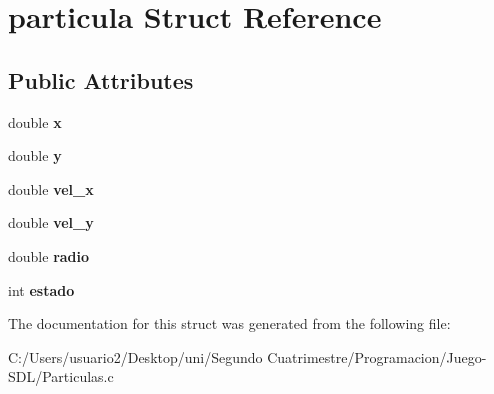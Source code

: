 \hypertarget{structparticula}{}\section{particula Struct Reference}
\label{structparticula}
\subsection*{Public Attributes}
\begin{DoxyCompactItemize}
\item 
double {\bfseries x}\hypertarget{structparticula_a906786cb7a5dc2a7f23ea413e509787e}{}\label{structparticula_a906786cb7a5dc2a7f23ea413e509787e}

\item 
double {\bfseries y}\hypertarget{structparticula_ab766b5e07eb1fe2cf2742875686cc305}{}\label{structparticula_ab766b5e07eb1fe2cf2742875686cc305}

\item 
double {\bfseries vel\+\_\+x}\hypertarget{structparticula_aec2c5c064b22d28bc6ed15ab14005f49}{}\label{structparticula_aec2c5c064b22d28bc6ed15ab14005f49}

\item 
double {\bfseries vel\+\_\+y}\hypertarget{structparticula_a9bad6bacd7b641e8f94428934deb103f}{}\label{structparticula_a9bad6bacd7b641e8f94428934deb103f}

\item 
double {\bfseries radio}\hypertarget{structparticula_a9f6f9f5e77b0e7cd28dc62eadca31d2d}{}\label{structparticula_a9f6f9f5e77b0e7cd28dc62eadca31d2d}

\item 
int {\bfseries estado}\hypertarget{structparticula_a8aa9a431be40b532014817a7fd51b9cc}{}\label{structparticula_a8aa9a431be40b532014817a7fd51b9cc}

\end{DoxyCompactItemize}


The documentation for this struct was generated from the following file\+:\begin{DoxyCompactItemize}
\item 
C\+:/\+Users/usuario2/\+Desktop/uni/\+Segundo Cuatrimestre/\+Programacion/\+Juego-\/\+S\+D\+L/Particulas.\+c\end{DoxyCompactItemize}
